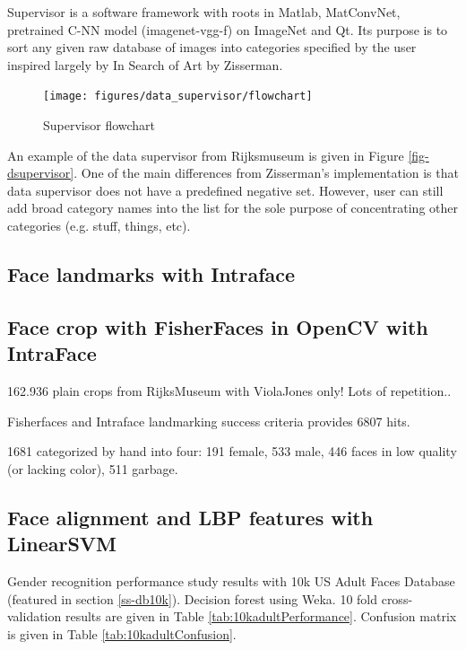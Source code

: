 \documentclass[runningheads]{llncs}
\begin{document}
Supervisor is a software framework with roots in Matlab\cite{MATLAB:2014}, MatConvNet\cite{matconvnet}, pretrained C-NN model\cite{Chatfield14} (imagenet-vgg-f) on ImageNet\cite{ILSVRC15} and Qt. Its purpose is to sort any given raw database of images into categories specified by the user inspired largely by In Search of Art by Zisserman\cite{Crowley14a}.

\begin{figure}
	\texttt{[image: figures/data\_supervisor/flowchart]}
	\caption{Supervisor flowchart}
	\label{fig:supervisorflow}
\end{figure}

An example of the data supervisor from Rijksmuseum\cite{rijksmuseum1976tot} is given in Figure \ref{fig-dsupervisor}. One of the main differences from Zisserman's\cite{Crowley14a} implementation is that data supervisor does not have a predefined negative set. However, user can still add broad category names into the list for the sole purpose of concentrating other categories (e.g. stuff, things, etc).









\subsection{Face landmarks with Intraface}

\subsection{Face crop with FisherFaces in OpenCV with IntraFace}
162.936 plain crops from RijksMuseum\cite{rijksmuseum1976tot} with ViolaJones only! Lots of repetition..

Fisherfaces and Intraface landmarking success criteria provides 6807 hits. 

1681 categorized by hand into four: 191 female, 533 male, 446 faces in low quality (or lacking color), 511 garbage.

\subsection{Face alignment and LBP features with LinearSVM}
Gender recognition performance study results with 10k US Adult Faces Database (featured in section \ref{ss-db10k}). Decision forest using Weka\cite{hall2009weka}. 10 fold cross-validation results are given in Table \ref{tab:10kadultPerformance}. Confusion matrix is given in Table \ref{tab:10kadultConfusion}.
\end{document}

